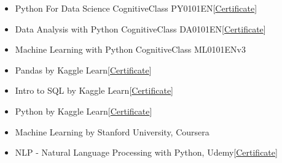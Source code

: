 \documentclass[10pt,a4paper,ragged2e]{altacv}
\begin{document}
\smallskip
\begin{itemize}
\item Python For Data Science CognitiveClass PY0101EN[\href{https://www.dropbox.com/s/iwxkw1sg1jnrsj3/Cognitiveclass\%20PY0101EN\%20Certificate\%20_\%20Cognitive\%20Class.pdf?dl=0}{Certificate}]
\item Data Analysis with Python CognitiveClass DA0101EN[\href{https://www.dropbox.com/s/w9udsb9ndrb8agj/CognitiveClass\%20DA0101EN\%20Certificate\%20_\%20Cognitive\%20Class.pdf?dl=0}{Certificate}]
\item Machine Learning with Python CognitiveClass ML0101ENv3
\item Pandas by Kaggle Learn[\href{https://www.dropbox.com/s/fb1hvlu12zobv00/SudhanshuKaushik\%20-\%20Pandas.png?dl=0}{Certificate}]
\item Intro to SQL by Kaggle Learn[\href{https://www.dropbox.com/s/5s1cn3cqyq16wqw/SudhanshuKaushik\%20-\%20Intro\%20to\%20SQL.png?dl=0}{Certificate}]
\item Python by Kaggle Learn[\href{https://www.dropbox.com/s/dsvbsbkx99rtvc1/SudhanshuKaushik\%20-\%20Python.png?dl=0}{Certificate}]
\item Machine Learning by Stanford University, Coursera
\item NLP - Natural Language Processing with Python, Udemy[\href{https://ude.my/UC-5ee14fa2-a6a9-45df-b561-a4bebcf52e71}{Certificate}]
\end{itemize}
\end{document}
